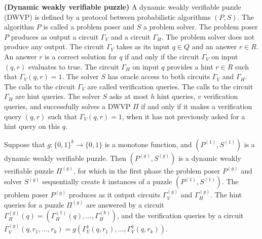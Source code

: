 \begin{definition} {\textbf{(Dynamic weakly verifiable puzzle)}}
  A dynamic weakly verifiable puzzle (DWVP) is defined by a protocol between probabilistic algorithms $(P,S)$.
  The algorithm $P$ is called a problem poser and $S$ a problem solver.
  The problem poser $P$ produces as output a circuit $\Gamma_{V}$ and a circuit $\Gamma_{H}$.
  The problem solver does not produce any output.
  The circuit $\Gamma_{V}$ takes as its input $q \in Q$ and an answer $r \in R$.
  An answer $r$ is a correct solution for $q$ if and only if the circuit $\Gamma_V$ on input $(q,r)$ evaluates to true.
  The circuit $\Gamma_H$ on input $q$ provides a hint $r \in R$ such that $\Gamma_V(q,r) = 1$.
  The solver $S$ has oracle access to both circuits $\Gamma_V$ and $\Gamma_H$.
  The calls to the circuit $\Gamma_V$ are called verification queries. The calls to the circuit $\Gamma_H$ are hint queries.
  The solver $S$ asks at most $h$ hint queries, $v$ verification queries, and successfully solves a DWVP $\Pi$ if and only if
  it makes a verification query $(q,r)$ such that $\Gamma_V(q,r) = 1$, when it has not previously asked for a hint query on this $q$.
\end{definition}
%
%
Suppose that $g: \{0,1\}^k \rightarrow \{0,1\}$ is a monotone function, and $\left( P^{(1)}, S^{(1)} \right)$ is a dynamic weakly verifiable puzzle.
Then $(P^{(g)}, S^{(g)})$ is a dynamic weakly verifiable puzzle $\Pi^{(g)}$, for which in the first phase the problem poser $P^{(g)}$ and solver $S^{(g)}$
sequentially create $k$ instances of a puzzle $\left( P^{(1)}, S^{(1)}\right)$. The problem poser $P^{(g)}$ produces as it output circuits $\Gamma_V^{(g)}$ and $\Gamma_H^{(g)}$.
The hint queries for a puzzle $\Pi^{(g)}$ are answered by a circuit $\Gamma_H^{(g)}(q) = \left( \Gamma_H^{(1)}(q), \dots, \Gamma_H^{(k)} \right)$, and the verification queries by a circuit $\Gamma_V^{(g)}(q, r_1, \dots, r_k) = g \left( \Gamma_V^{1}(q, r_1), \dots, \Gamma_V^{k}(q, r_k) \right)$.

